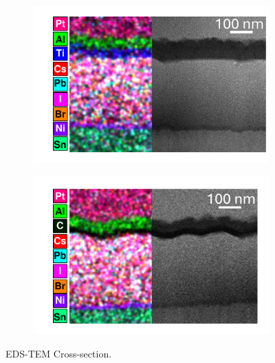 \begin{figure}[htbp]
    \centering
    \begin{subfigure}[t]{0.45\textwidth} %
        \centering
        \includegraphics[width=\textwidth]{chapters/transport_layers/images/EDS_TEM_TiO2.pdf} %
        \caption{}
        \label{}
    \end{subfigure}
    \hfill %
    \begin{subfigure}[t]{0.45\textwidth} %
        \centering
        \includegraphics[width=\textwidth]{chapters/transport_layers/images/EDS_TEM_C60.pdf} %
        \caption{}
        \label{}
    \end{subfigure}
    \caption{EDS-TEM Cross-section.}
    \label{fig:etl_optimization:eds_tem_crossection}
\end{figure}

